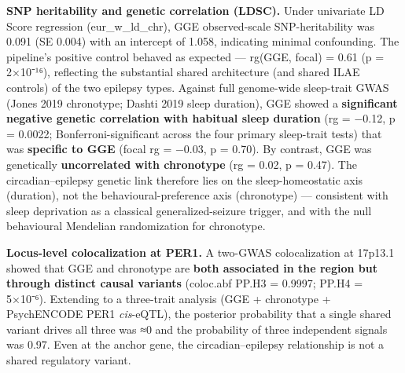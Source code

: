 \documentclass[
]{article}
\begin{document}
\textbf{SNP heritability and genetic correlation (LDSC).} Under
univariate LD Score regression (eur\_w\_ld\_chr), GGE observed-scale
SNP-heritability was 0.091 (SE 0.004) with an intercept of 1.058,
indicating minimal confounding. The pipeline's positive control behaved
as expected --- rg(GGE, focal) = 0.61 (p = 2×10⁻¹⁶), reflecting the
substantial shared architecture (and shared ILAE controls) of the two
epilepsy types. Against full genome-wide sleep-trait GWAS (Jones 2019
chronotype; Dashti 2019 sleep duration), GGE showed a
\textbf{significant negative genetic correlation with habitual sleep
duration} (rg = −0.12, p = 0.0022; Bonferroni-significant across the
four primary sleep-trait tests) that was \textbf{specific to GGE} (focal
rg = −0.03, p = 0.70). By contrast, GGE was genetically
\textbf{uncorrelated with chronotype} (rg = 0.02, p = 0.47). The
circadian--epilepsy genetic link therefore lies on the sleep-homeostatic
axis (duration), not the behavioural-preference axis (chronotype) ---
consistent with sleep deprivation as a classical generalized-seizure
trigger, and with the null behavioural Mendelian randomization for
chronotype.

\textbf{Locus-level colocalization at PER1.} A two-GWAS colocalization
at 17p13.1 showed that GGE and chronotype are \textbf{both associated in
the region but through distinct causal variants} (coloc.abf PP.H3 =
0.9997; PP.H4 = 5×10⁻⁶). Extending to a three-trait analysis (GGE +
chronotype + PsychENCODE PER1 \emph{cis}-eQTL), the posterior
probability that a single shared variant drives all three was ≈0 and the
probability of three independent signals was 0.97. Even at the anchor
gene, the circadian--epilepsy relationship is not a shared regulatory
variant.
\end{document}
